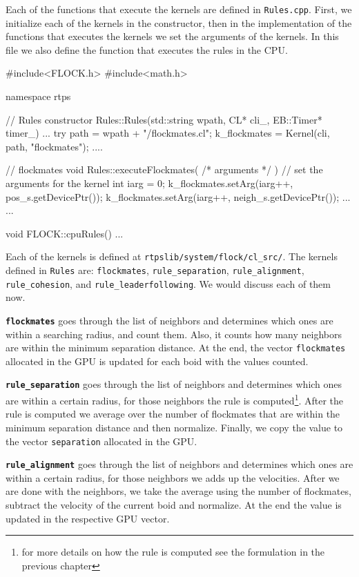 Each of the functions that execute the kernels are defined in \texttt{Rules.cpp}. First, we initialize each of the kernels in the constructor, then in the implementation of the functions that executes the kernels we set the arguments of the kernels. In this file we also define the function that executes the rules in the CPU.

\begin{cppcode}{0}
#include<FLOCK.h>
#include<math.h>

namespace rtps
{
	// Rules constructor
	Rules::Rules(std::string wpath, CL* cli_, EB::Timer* timer_)
	{
		...
		try
		{
			path = wpath + "/flockmates.cl";
			k_flockmates = Kernel(cli, path, "flockmates");
		}
		....
	}

	// flockmates
	void Rules::executeFlockmates( /* arguments */ )
	{
		// set the arguments for the kernel
		int iarg = 0;
		k_flockmates.setArg(iarg++, pos_s.getDevicePtr());
		k_flockmates.setArg(iarg++, neigh_s.getDevicePtr());
		...
	}
	...
	
	void FLOCK::cpuRules()
	{
		...
	}
}
\end{cppcode}

Each of the kernels is defined at \texttt{rtpslib/system/flock/cl\_src/}. The kernels defined in \texttt{Rules} are: \texttt{flockmates}, \texttt{rule\_separation}, \texttt{rule\_alignment}, \texttt{rule\_cohesion}, and \texttt{rule\_leaderfollowing}. We would discuss each of them now.

\texttt{\textbf{flockmates}} goes through the list of neighbors and determines which ones are within a searching radius, and count them. Also, it counts how many neighbors are within the minimum separation distance. At the end, the vector \texttt{flockmates} allocated in the GPU is updated for each boid with the values counted.

\texttt{\textbf{rule\_separation}} goes through the list of neighbors and determines which ones are within a certain radius, for those neighbors the rule is computed\footnote{for more details on how the rule is computed see the formulation in the previous chapter}. After the rule is computed we average over the number of flockmates that are within the minimum separation distance and then normalize. Finally, we copy the value to the vector \texttt{separation} allocated in the GPU.

\texttt{\textbf{rule\_alignment}} goes through the list of neighbors and determines which ones are within a certain radius, for those neighbors we adds up the velocities. After we are done with the neighbors, we take the average using the number of flockmates, subtract the velocity of the current boid and normalize. At the end the value is updated in the respective GPU vector. 

